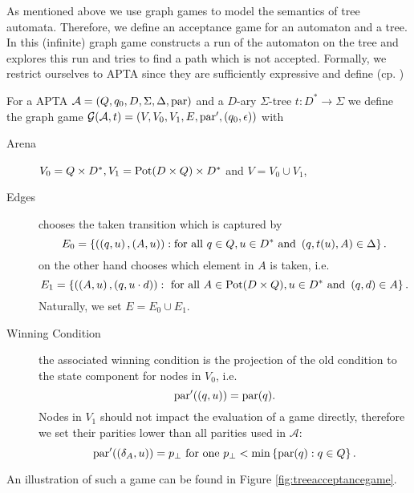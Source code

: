 As mentioned above we use graph games to model the semantics of tree automata.
Therefore, we define an acceptance game for an automaton and a tree. In this
(infinite) graph game \eve{} constructs a run of the automaton on the 
tree and \adam{} explores this run and tries to find a path which is not 
accepted. Formally, we restrict ourselves to \ac{APTA} since they are 
sufficiently expressive and define (cp. \cite{treeautosurvey,AltTreeAuto})
\begin{definition}
  \label{def:acceptancegame}
  For a \ac{APTA} $\mathcal{A} = \left(Q, q_{0}, D, \Sigma, \Delta, \operatorname{par}\right)$
  and a $D$-ary $\Sigma$-tree $t:D^{*}\rightarrow\Sigma$ we define the graph 
  game $\mathcal{G}(\mathcal{A}, t) = \left(V, V_{0}, V_{1}, E, 
  \operatorname{par}', \left(q_{0},\epsilon\right)\right)$ with
  \begin{description}
    \item [Arena] 
      $V_{0} = Q\times D^{*}, V_{1} = \operatorname{Pot}(D\times Q)\times D^{*}$ and
      $V = V_{0}\cup V_{1}$,
    \item [Edges]
      \eve{} chooses the taken transition which is captured by
      \begin{equation*}
        E_{0} = \left\{
          \left(\left(q, u\right),\left(A, u\right)\right):\text{for all }
          q\in Q,u\in D^{*}\text{ and }\left(q, t(u), A\right)\in\Delta
        \right\}.
      \end{equation*}
      \adam{} on the other hand chooses which element in $A$ is taken, i.e.
      \begin{equation*}
        E_{1} = \left\{
          \left(\left(A, u\right), \left(q, u\cdot d\right)\right):\text{ for all }
          A\in\operatorname{Pot}(D\times Q), u\in D^{*}\text{ and }\left(q,d\right)\in A
        \right\}.
      \end{equation*}
      Naturally, we set $E = E_{0}\cup E_{1}$.
    \item [Winning Condition]
      the associated winning condition is the projection of the old 
      condition to the state component for nodes in $V_{0}$, i.e.
      \begin{equation*}
        \operatorname{par}'(\left(q, u\right)) = \operatorname{par}(q).
      \end{equation*}
      Nodes in $V_{1}$ should not impact the evaluation of a game directly, 
      therefore we set their parities lower than all parities used in 
      $\mathcal{A}$:
      \begin{equation*}
        \operatorname{par}'(\left(\delta_{A}, u\right)) = p_{\bot}
        \text{ for one }p_{\bot} < \min\left\{\operatorname{par}(q):q\in Q\right\}.
      \end{equation*}
  \end{description}
  \label{def:treemembershipgame}
\end{definition}
An illustration of such a game can be found in Figure 
\ref{fig:treeacceptancegame}. 

